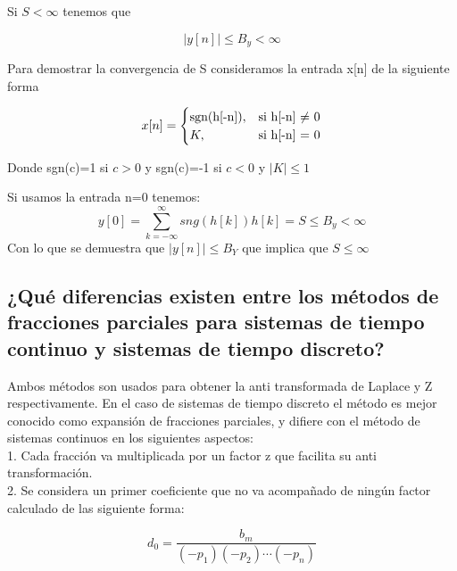 	Si $S<\infty$ tenemos que 
	
	\begin{equation}
		|y[n]|\leq B_y < \infty
	\end{equation}
	
	Para demostrar la convergencia de S consideramos la entrada x[n] de la siguiente forma
	
	\[
	x[n]=
	\begin{cases}
		$sgn(h[-n])$, & \text{si h[-n]  $\neq$ 0} \\
		K, & \text{si h[-n] = 0}				\end{cases}
	\]
	
	Donde sgn(c)=1 si $c>0$ y sgn(c)=-1 si $c<0$ y $|K| \leq 1$
	\newline
	
	Si usamos la entrada n=0 tenemos:
	\begin{equation}
		y[0]=\sum_{k=-\infty}^\infty sng(h[k]) h[k] = S \leq B_y < \infty
	\end{equation}
	Con lo que se demuestra que $|y[n]| \leq B_Y$ que implica que $S\leq\infty$

\subsection{¿Qué diferencias existen entre los métodos de fracciones parciales para sistemas de tiempo continuo y sistemas de tiempo discreto?}

Ambos métodos son usados para obtener la anti transformada de Laplace y Z respectivamente. En el caso de sistemas de tiempo discreto el método es mejor conocido como expansión de fracciones parciales, y difiere con el método de sistemas continuos en los siguientes aspectos:\\
1. Cada fracción va multiplicada por un factor z que facilita su anti transformación.\\
2. Se considera un primer coeficiente que no va acompañado de ningún factor calculado de las siguiente forma:


\begin{equation}
	d_{0}=\frac{b_{m}}{(- p_{1})(- p_{2}) \cdots (- p_{n})}
\end{equation}

